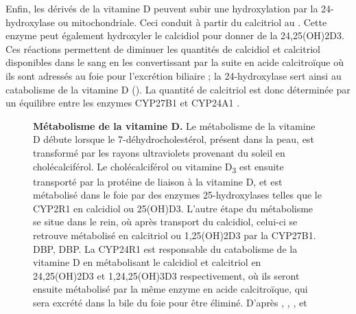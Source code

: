 \documentclass[
  a4paper,
  DIV=11,
  numbers=noendperiod,
  listof=totoc]{scrreprt}
\begin{document}
Enfin, les dérivés de la vitamine D peuvent subir une hydroxylation par
la 24-hydroxylase ou  mitochondriale. Ceci conduit à
partir du calcitriol au . Cette enzyme peut
également hydroxyler le calcidiol pour donner de la \ac{24,25(OH)2D3}.
Ces réactions permettent de diminuer les quantités de calcidiol et
calcitriol disponibles dans le sang en les convertissant par la suite en
acide calcitroïque où ils sont adressés au foie pour l'excrétion
biliaire \autocite{Prosser.2004} ; la 24-hydroxylase sert ainsi au
catabolisme de la vitamine D \autocite{Norman.2008}
(). La quantité de calcitriol est donc
déterminée par un équilibre entre les enzymes \ac{CYP27B1} et
\ac{CYP24A1} \autocite{Dankers.2017}.

\begin{figure}


\caption[Métabolisme de la vitamine
D.]{\label{fig-vitd-metabolism}\textbf{Métabolisme de la vitamine D.} Le
métabolisme de la vitamine D débute lorsque le 7-déhydrocholestérol,
présent dans la peau, est transformé par les rayons ultraviolets
provenant du soleil en cholécalciférol. Le cholécalciférol ou vitamine
D\textsubscript{3} est ensuite transporté par la protéine de liaison à
la vitamine D, et est métabolisé dans le foie par des enzymes
25-hydroxylases telles que le CYP2R1 en calcidiol ou \ac{25(OH)D3}.
L'autre étape du métabolisme se situe dans le rein, où après transport
du calcidiol, celui-ci se retrouve métabolisé en calcitriol ou
\ac{1,25(OH)2D3} par la \ac{CYP27B1}. \ac{DBP}, \acl{DBP}. La CYP24R1
est responsable du catabolisme de la vitamine D en métabolisant le
calcidiol et calcitriol en \ac{24,25(OH)2D3} et \ac{1,24,25(OH)3D3}
respectivement, où ils seront ensuite métabolisé par la même enzyme en
acide calcitroïque, qui sera excrété dans la bile du foie pour être
éliminé. D'après \textcite{Dankers.2017}, \textcite{Tsiaras.2011},
\textcite{Christakos.2010}, et \textcite{Prosser.2004}}

\end{figure}%
\end{document}
